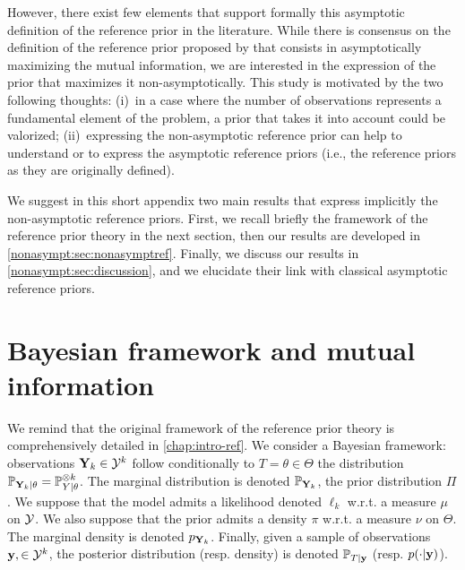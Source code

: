 
However, there exist few elements that support formally this asymptotic definition of the reference prior in the literature.
While there is consensus on the definition of the reference prior proposed by \citet{bernardo_reference_1979} that consists in asymptotically maximizing the mutual information, we are interested in the expression of the prior that maximizes it non-asymptotically.
This study is motivated by the two following thoughts: (i)~in a case where the number of observations represents a fundamental element of the problem, a prior that takes it into account could be valorized; (ii)~expressing the non-asymptotic reference prior can help to understand or to express the asymptotic reference priors (i.e., the reference priors as they are originally defined).

We suggest in this short appendix two main results that express implicitly the non-asymptotic reference priors. First, we recall briefly the framework of the reference prior theory in the next section, then our results are developed in \cref{nonasympt:sec:nonasymptref}.
Finally, we discuss our results in \cref{nonasympt:sec:discussion}, and we elucidate their link with classical asymptotic reference priors.




\section{Bayesian framework and mutual information}\label{nonasympt:sec:framework}

We remind that the original framework of the reference prior theory is comprehensively detailed in \cref{chap:intro-ref}. We consider a Bayesian framework: observations $\mathbf{Y}_k\in\mathcal{Y}^k$ follow conditionally to $T=\theta\in\Theta$ the distribution $\mathbb{P}_{\mathbf{Y}_k|\theta}=\mathbb{P}_{Y|\theta}^{\otimes k}$. The marginal distribution is denoted  $\mathbb{P}_{\mathbf{Y}_k}$,  the prior distribution $\varPi$. %
We suppose that the model admits a likelihood denoted $\ell_k$ w.r.t. a measure $\mu$ on $\mathcal{Y}$.
We also suppose that the prior admits a density $\pi$ w.r.t. a measure $\nu$ on $\Theta$.
The marginal density is denoted $p_{\mathbf{Y}_k}$. Finally, given a sample of observations $\mathbf{y},\in\mathcal{Y}^k$, the posterior distribution (resp. density) is denoted $\mathbb{P}_{T|\mathbf{y}}$ (resp. $p(\cdot|\mathbf{y})$).

